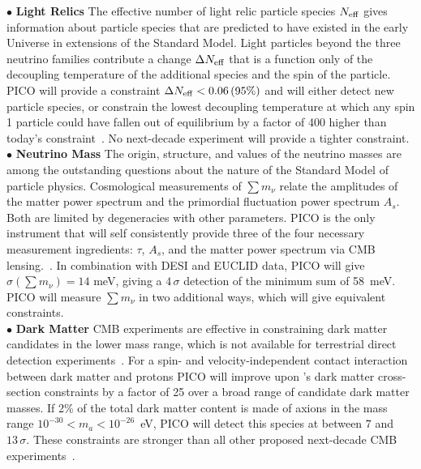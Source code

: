 \documentclass[PICOAPC.tex]{subfiles}
\begin{document}
$\bullet$ {\bf Light Relics} \hspace{0.1in} The effective number of light relic particle species ${N_{\rm eff}}$ gives information about particle species that are predicted to have existed in the early Universe in extensions of the Standard Model. Light particles beyond the three neutrino families contribute a change $\Delta {N_{\rm eff}}$ that is a function only of the decoupling temperature of the additional species and the spin of the particle. PICO will provide a constraint $\Delta {N_{\rm eff}} < 0.06 \, (95\%)$ and will either detect new particle species, or constrain the lowest decoupling temperature at which any spin 1 particle could have fallen out of equilibrium by a factor of 400 higher than today's constraint~\citep{green_swp}. No next-decade experiment will provide a tighter constraint.   \\ 
%
$\bullet$ {\bf Neutrino Mass} \hspace{0.1in} \label{neutrino_fundamental} The origin, structure, and values of the neutrino masses are among the outstanding questions about the nature of the Standard Model of particle physics.  
Cosmological measurements of $\sum m_\nu$ relate the amplitudes of the matter power spectrum and the primordial fluctuation power spectrum $A_s$.  Both are limited by degeneracies with other parameters. PICO is the only instrument that will self consistently provide three of the four necessary measurement ingredients: $\tau$, $A_s$, and the matter power spectrum via CMB lensing.~\citep{green_swp,dvorkin_swp}. 
In combination with DESI and EUCLID data, PICO will give $\sigma(\sum m_\nu) = 14$ meV, giving a $4\,\sigma$ detection of the minimum sum of 58~meV. PICO will measure  $\sum m_\nu$ in two additional ways, which will give equivalent constraints. \\
%
$\bullet$ {\bf Dark Matter} \hspace{0.1in} \ac{CMB} experiments are effective in constraining dark matter candidates in the lower mass range, which is not available for terrestrial direct detection experiments~\citep{Slatyer2009,Galli2009,Huetsi2009,Huetsi2011,Madhavacheril:2013cna,Green:2018pmd}. 
For a spin- and velocity-independent contact interaction between dark matter and protons PICO will improve upon \planck 's dark matter cross-section constraints by a factor of 25 over a broad range of candidate dark matter masses. If 2\% of the total dark matter content is made of axions in the mass range $10^{-30} < m_{a} < 10^{-26}$~eV, PICO will detect this species at between $7$ and $13\,\sigma$.  These constraints are stronger than all other proposed next-decade CMB experiments~\citep{gluscevic_swp}. \\
\end{document}
